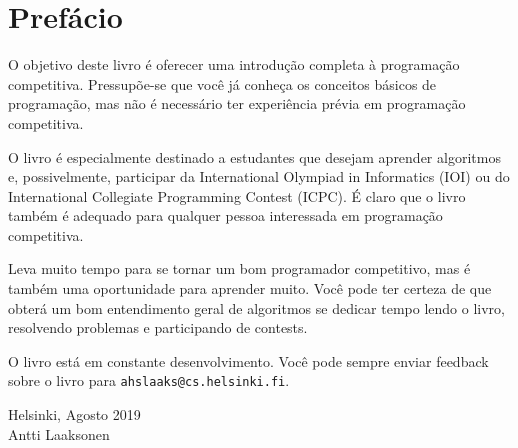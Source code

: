 \chapter*{Prefácio}

O objetivo deste livro é oferecer uma introdução completa à programação competitiva. Pressupõe-se que você já conheça os conceitos básicos de programação, mas não é necessário ter experiência prévia em programação competitiva.

O livro é especialmente destinado a estudantes que desejam aprender algoritmos e, possivelmente, participar da International Olympiad in Informatics (IOI) ou do International Collegiate Programming Contest (ICPC). É claro que o livro também é adequado para qualquer pessoa interessada em programação competitiva.

Leva muito tempo para se tornar um bom programador competitivo, mas é também uma oportunidade para aprender muito. Você pode ter certeza de que obterá um bom entendimento geral de algoritmos se dedicar tempo lendo o livro, resolvendo problemas e participando de contests.

O livro está em constante desenvolvimento. Você pode sempre enviar feedback sobre o livro para
\texttt{ahslaaks@cs.helsinki.fi}.

\begin{flushright}
Helsinki, Agosto 2019 \\
Antti Laaksonen
\end{flushright}

